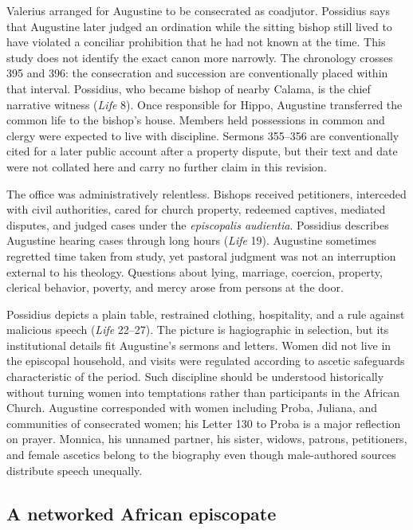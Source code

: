 Valerius arranged for Augustine to be consecrated as coadjutor. Possidius says
that Augustine later judged an ordination while the sitting bishop still lived
to have violated a conciliar prohibition that he had not known at the time.
This study does not identify the exact canon more narrowly. The chronology
crosses 395 and 396: the consecration and succession are conventionally placed
within that interval. Possidius, who became bishop of nearby Calama, is the
chief narrative witness (\emph{Life} 8). Once responsible for
Hippo, Augustine transferred the common life to the bishop's house. Members
held possessions in common and clergy were expected to live with discipline.
Sermons 355--356 are conventionally cited for a later public account after a
property dispute, but their text and date were not collated here and carry no
further claim in this revision.

The office was administratively relentless. Bishops received petitioners,
interceded with civil authorities, cared for church property, redeemed
captives, mediated disputes, and judged cases under the \emph{episcopalis
audientia}. Possidius describes Augustine hearing cases through long hours
(\emph{Life} 19). Augustine sometimes regretted time taken from study, yet
pastoral judgment was not an interruption external to his theology. Questions
about lying, marriage, coercion, property, clerical behavior, poverty, and
mercy arose from persons at the door.

Possidius depicts a plain table, restrained clothing, hospitality, and a rule
against malicious speech (\emph{Life} 22--27). The picture is hagiographic in
selection, but its institutional details fit Augustine's sermons and letters.
Women did not live in the episcopal household, and visits were regulated
according to ascetic safeguards characteristic of the period. Such discipline
should be understood historically without turning women into temptations
rather than participants in the African Church. Augustine corresponded with
women including Proba, Juliana, and communities of consecrated women; his
Letter 130 to Proba is a major reflection on prayer. Monnica, his unnamed
partner, his sister, widows, patrons, petitioners, and female ascetics belong
to the biography even though male-authored sources distribute speech
unequally.

\subsection{A networked African episcopate}


